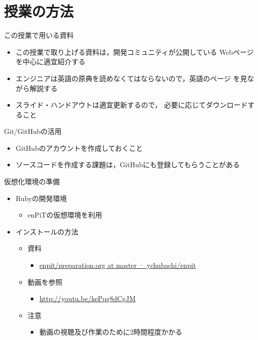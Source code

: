 \documentclass[t, aspectratio=169]{beamer}
\begin{document}
\section{授業の方法}
\label{sec-1-3}
\begin{frame}[label=sec-1-3-1]{この授業で用いる資料}
\begin{itemize}
\item この授業で取り上げる資料は，開発コミュニティが公開している
Webページを中心に適宜紹介する
\item エンジニアは英語の原典を読めなくてはならないので，英語のページ
を見ながら解説する
\item スライド・ハンドアウトは適宜更新するので，
必要に応じてダウンロードすること
\end{itemize}
\end{frame}
\begin{frame}[label=sec-1-3-2]{Git/GitHubの活用}
\begin{itemize}
\item GitHubのアカウントを作成しておくこと
\item ソースコードを作成する課題は，GitHubにも登録してもらうことがある
\end{itemize}
\end{frame}
\begin{frame}[label=sec-1-3-3]{仮想化環境の準備}
\begin{itemize}
\item Rubyの開発環境
\begin{itemize}
\item enPiTの仮想環境を利用
\end{itemize}
\item インストールの方法
\begin{itemize}
\item 資料
\begin{itemize}
\item \href{https://github.com/ychubachi/enpit/blob/master/slides/preparation.org}{enpit/preparation.org at master · ychubachi/enpit}
\end{itemize}
\item 動画を参照
\begin{itemize}
\item \url{http://youtu.be/kePqg8dCgJM}
\end{itemize}
\item 注意
\begin{itemize}
\item 動画の視聴及び作業のために2時間程度かかる
\end{itemize}
\end{itemize}
\end{itemize}
\end{frame}
\end{document}
